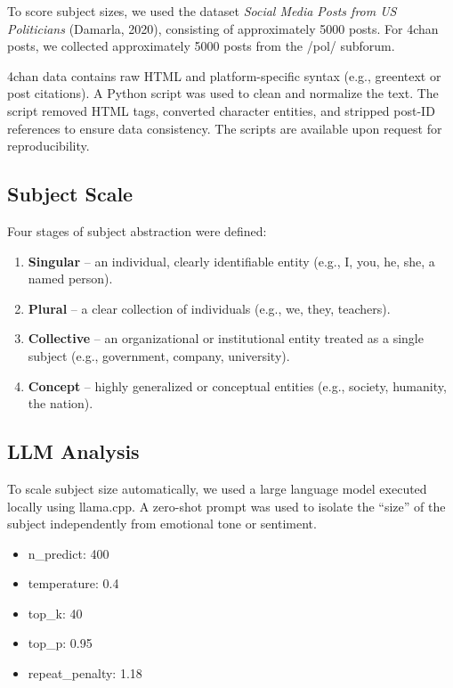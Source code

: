 \documentclass{article}
\begin{document}
To score subject sizes, we used the dataset \textit{Social Media Posts from US 
Politicians} (Damarla, 2020), consisting of approximately 5000 posts. 
For 4chan posts, we collected approximately 5000 posts from the /pol/ subforum.

4chan data contains raw HTML and platform-specific syntax (e.g., greentext 
or post citations). A Python script was used to clean and normalize the text. 
The script removed HTML tags, converted character entities, and stripped 
post-ID references to ensure data consistency. The scripts are available upon request for reproducibility.

\subsection{Subject Scale}

Four stages of subject abstraction were defined:

\begin{enumerate}
\item \textbf{Singular} – an individual, clearly identifiable entity (e.g., I, you, he, she, a named person).
\item \textbf{Plural} – a clear collection of individuals (e.g., we, they, teachers).
\item \textbf{Collective} – an organizational or institutional entity treated as a single subject (e.g., government, company, university).
\item \textbf{Concept} – highly generalized or conceptual entities (e.g., society, humanity, the nation).
\end{enumerate}

\subsection{LLM Analysis}

To scale subject size automatically, we used a large language model executed locally using llama.cpp. 
A zero-shot prompt was used to isolate the ``size'' of the subject 
independently from emotional tone or sentiment.

\begin{itemize}
\item n\_predict: 400
\item temperature: 0.4
\item top\_k: 40
\item top\_p: 0.95
\item repeat\_penalty: 1.18
\end{itemize}
\end{document}
